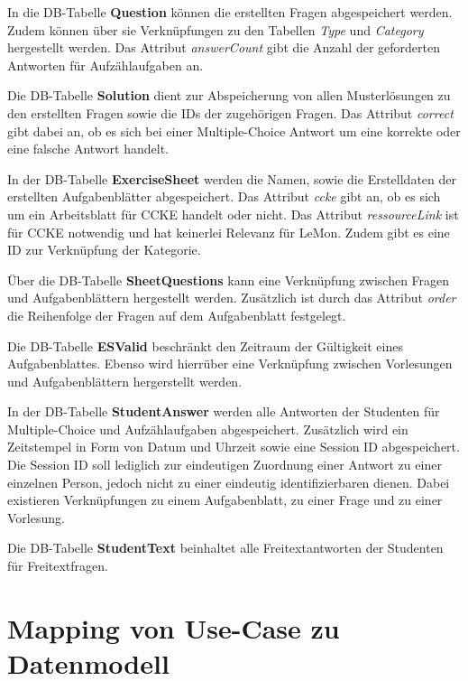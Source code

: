 In die DB-Tabelle \textbf{Question} können die erstellten Fragen abgespeichert werden.
Zudem können über sie Verknüpfungen zu den Tabellen \emph{Type} und
\emph{Category} hergestellt werden. Das Attribut \emph{answerCount} gibt die
Anzahl der geforderten Antworten für Aufzählaufgaben an.

Die DB-Tabelle \textbf{Solution} dient zur Abspeicherung von allen
Musterlösungen zu den erstellten Fragen sowie die IDs der zugehörigen Fragen.
Das Attribut \emph{correct} gibt dabei an, ob es sich bei einer Multiple-Choice
Antwort um eine korrekte oder eine falsche Antwort handelt.

In der DB-Tabelle \textbf{ExerciseSheet} werden die Namen, sowie die
Erstelldaten der erstellten Aufgabenblätter abgespeichert. Das Attribut
\emph{ccke} gibt an, ob es sich um ein Arbeitsblatt für \gls{CCKE} handelt oder
nicht. Das Attribut \emph{ressourceLink} ist für \gls{CCKE} notwendig und hat
keinerlei Relevanz für \gls{LeMon}. Zudem gibt es eine ID zur Verknüpfung der
Kategorie.

Über die DB-Tabelle \textbf{SheetQuestions} kann eine Verknüpfung zwischen
Fragen und Aufgabenblättern hergestellt werden. Zusätzlich ist durch das
Attribut \emph{order} die Reihenfolge der Fragen auf dem Aufgabenblatt
festgelegt.

Die DB-Tabelle \textbf{ESValid} beschränkt den Zeitraum der Gültigkeit eines
Aufgabenblattes. Ebenso wird hierrüber eine Verknüpfung zwischen Vorlesungen und
Aufgabenblättern hergerstellt werden.

In der DB-Tabelle \textbf{StudentAnswer} werden alle Antworten der Studenten
für Multiple-Choice und Aufzählaufgaben abgespeichert. Zusätzlich wird ein Zeitstempel in Form
von Datum und Uhrzeit sowie eine Session ID abgespeichert. Die Session ID soll
lediglich zur eindeutigen Zuordnung einer Antwort zu einer einzelnen Person,
jedoch nicht zu einer eindeutig identifizierbaren dienen. Dabei existieren
Verknüpfungen zu einem Aufgabenblatt, zu einer Frage und zu einer Vorlesung.

Die DB-Tabelle \textbf{StudentText} beinhaltet alle Freitextantworten der
Studenten für Freitextfragen.




\section{Mapping von Use-Case zu Datenmodell}

